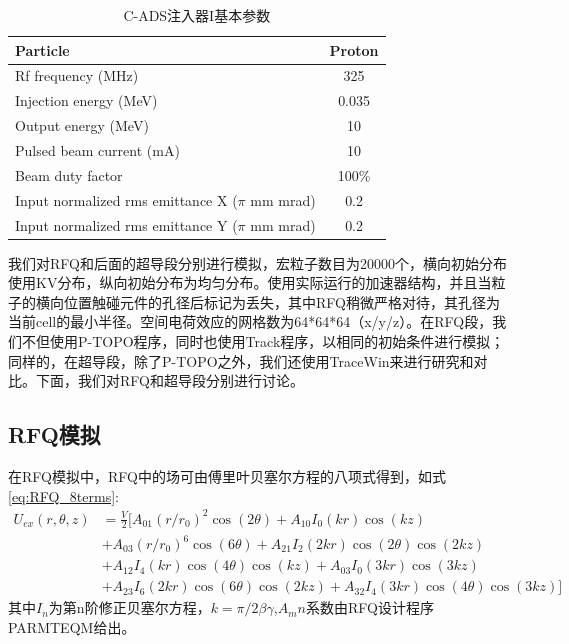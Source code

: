\begin{table}[!htbp]
    \centering
    \footnotesize%
    \setlength{\tabcolsep}{4pt}%
    \renewcommand{\arraystretch}{1.2}%
    \begin{tabular}{lc}
        \hline\hline
        Particle                & Proton \\
        \hline
        Rf frequency (MHz)      & 325       \\
        \hline
        Injection energy (MeV)  & 0.035     \\
        \hline
        Output energy (MeV)     & 10        \\
        \hline
        Pulsed beam current (mA)& 10        \\
        \hline
        Beam duty factor        & 100\%     \\
        \hline
        Input normalized rms emittance X ($\pi$ mm mrad)    & 0.2        \\
        \hline
        Input normalized rms emittance Y ($\pi$ mm mrad)    & 0.2        \\
        \hline\hline
    \end{tabular}
    \caption{C-ADS注入器I基本参数}
    \label{tab:C_ADS_parameters}
\end{table}

我们对RFQ和后面的超导段分别进行模拟，宏粒子数目为20000个，横向初始分布使用KV分布，纵向初始分布为均匀分布。使用实际运行的加速器结构，并且当粒子的横向位置触碰元件的孔径后标记为丢失，其中RFQ稍微严格对待，其孔径为当前cell的最小半径。空间电荷效应的网格数为64*64*64（x/y/z）。在RFQ段，我们不但使用P-TOPO程序，同时也使用Track程序\cite{aseev2005track}，以相同的初始条件进行模拟；同样的，在超导段，除了P-TOPO之外，我们还使用TraceWin\cite{uriot2014tracewin}来进行研究和对比。下面，我们对RFQ和超导段分别进行讨论。

\subsection{RFQ模拟}
在RFQ模拟中，RFQ中的场可由傅里叶贝塞尔方程的八项式得到，如式\ref{eq:RFQ_8terms}:
\begin{equation}
    \begin{aligned}
       {{U}_{ex}}(r,\theta ,z) & =\frac{V}{2}[{{A}_{01}}{{(r/{{r}_{0}})}^{2}}\cos (2\theta )+{{A}_{10}}{{I}_{0}}(kr)\cos (kz) \\
     & +{{A}_{03}}{{(r/{{r}_{0}})}^{6}}\cos (6\theta )+{{A}_{21}}{{I}_{2}}(2kr)\cos (2\theta )\cos (2kz) \\
     & +{{A}_{12}}{{I}_{4}}(kr)\cos (4\theta )\cos (kz)+{{A}_{03}}{{I}_{0}}(3kr)\cos (3kz) \\
     & +{{A}_{23}}{{I}_{6}}(2kr)\cos (6\theta )\cos (2kz)+{{A}_{32}}{{I}_{4}}(3kr)\cos (4\theta )\cos (3kz)]
    \end{aligned}
    \label{eq:RFQ_8terms}
\end{equation}
其中$I_n$为第n阶修正贝塞尔方程，$k=\pi /2\beta \gamma$,$A_mn$系数由RFQ设计程序PARMTEQM给出。

